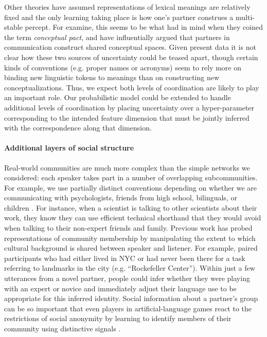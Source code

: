 Other theories have assumed representations of lexical meanings are relatively fixed and the only learning taking place is how one's partner construes a multi-stable percept. 
For examine, this seems to be what  had in mind when they coined the term \emph{conceptual pact}, and \cite{stolk2016conceptual} have influentially argued that partners in communication construct shared conceptual spaces. 
Given present data it is not clear how these two sources of uncertainty could be teased apart, though certain kinds of conventions (e.g. proper names or acronyms) seem to rely more on binding new linguistic tokens to meanings than on constructing new conceptualizations.
Thus, we expect both levels of coordination are likely to play an important role. 
Our probabilistic model could be extended to handle additional levels of coordination by placing uncertainty over a hyper-parameter corresponding to the intended feature dimension that must be jointly inferred with the correspondence along that dimension. 


\paragraph{Additional layers of social structure}

Real-world communities are much more complex than the simple networks we considered: each speaker takes part in a number of overlapping subcommunities. 
For example, we use partially distinct conventions depending on whether we are communicating with psychologists, friends from high school, bilinguals, or children \cite{auer_code-switching_2013}.
For instance, when a scientist is talking to other scientists about their work, they know they can use efficient technical shorthand that they would avoid when talking to their non-expert friends and family. 
Previous work has probed representations of community membership by manipulating the extent to which cultural background is shared between speaker and listener.
For example,  paired participants who had either lived in NYC or had never been there for a task referring to landmarks in the city (e.g. ``Rockefeller Center''). 
Within just a few utterances from a novel partner, people could infer whether they were playing with an expert or novice and immediately adjust their language use to be appropriate for this inferred identity. 
Social information about a partner’s group can be so important that even players in artificial-language games react to the restrictions of social anonymity by learning to identify members of their community using distinctive signals \cite{roberts_experimental_2010}.

